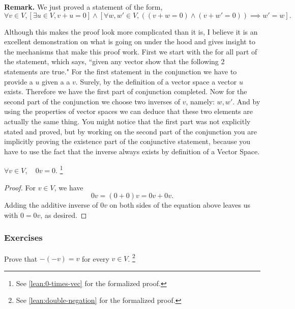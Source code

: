 \documentclass[12pt]{book}
\begin{document}
\textbf{Remark.} We just proved a statement of the form,
\[
    \forall v \in V, [\exists u \in V, v + u = 0] \land [\forall w,w' \in V, ((v + w = 0) \land (v + w' = 0))\implies w' = w].
\]

Although this makes the proof look more complicated than it is, I believe it is an excellent demonstration on what is going on under the hood and gives insight to the mechanisms that make this proof work. First we start with the for all part of the statement, which says, ``given any vector show that the following 2 statements are true." For the first statement in the conjunction we have to provide a $u$ given a a $v$. Surely, by the definition of a vector space a vector $u$ exists. Therefore we have the first part of conjunction completed. Now for the second part of the conjunction we choose two inverses of $v$, namely: $w,w'$. And by using the properties of vector spaces we can deduce that these two elements are actually the same thing. You might notice that the first part was not explicitly stated and proved, but by working on the second part of the conjunction you are implicitly proving the existence part of the conjunctive statement, because you have to use the fact that the inverse always exists by definition of a Vector Space.

\begin{theorem} \label{thm:0-times-vec}
    $\forall v \in V, \quad 0v = 0.$ \footnote{See \cref{lean:0-times-vec} for the formalized proof.}
\end{theorem}

\begin{proof}
    For $v \in V$, we have
    \[
        0v = (0 + 0)v = 0v + 0v.
    \]
    Adding the additive inverse of $0v$ on both sides of the equation above leaves us with $0 = 0v$, as desired.
\end{proof}



\newpage

\subsubsection*{Exercises}



\begin{exercise}\label{ex:double-negation}
    Prove that $-(-v) = v$ for every $v \in V$. \footnote{See \cref{lean:double-negation} for the formalized proof.}
\end{exercise}
\end{document}

